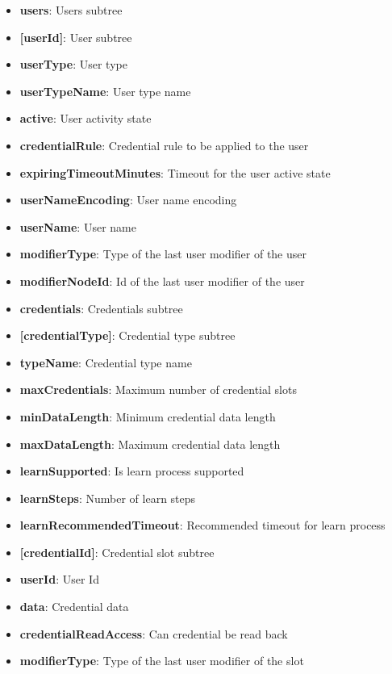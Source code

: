 \begin{itemize}
\item \textbf{users}: Users subtree
\item \textbf{    [userId]}: User subtree
\item \textbf{        userType}: User type
\item \textbf{        userTypeName}: User type name
\item \textbf{        active}: User activity state
\item \textbf{        credentialRule}: Credential rule to be applied to the user
\item \textbf{        expiringTimeoutMinutes}: Timeout for the user active state
\item \textbf{        userNameEncoding}: User name encoding
\item \textbf{        userName}: User name
\item \qquad\textbf{modifierType}: Type of the last user modifier of the user
\item \qquad\textbf{modifierNodeId}: Id of the last user modifier of the user
\item \textbf{credentials}: Credentials subtree
\item \qquad\textbf{[credentialType]}: Credential type subtree
\item \qquad\qquad\textbf{typeName}: Credential type name
\item \qquad\qquad\textbf{maxCredentials}: Maximum number of credential slots
\item \qquad\qquad\textbf{minDataLength}: Minimum credential data length
\item \qquad\qquad\textbf{maxDataLength}: Maximum credential data length
\item \qquad\qquad\textbf{learnSupported}: Is learn process supported
\item \qquad\qquad\textbf{learnSteps}: Number of learn steps
\item \qquad\qquad\textbf{learnRecommendedTimeout}: Recommended timeout for learn process
\item \qquad\qquad\textbf{[credentialId]}: Credential slot subtree
\item \qquad\qquad\qquad\textbf{userId}: User Id
\item \qquad\qquad\qquad\textbf{data}: Credential data
\item \qquad\qquad\qquad\textbf{credentialReadAccess}: Can credential be read back
\item \qquad\qquad\qquad\textbf{modifierType}: Type of the last user modifier of the slot

\end{itemize}
